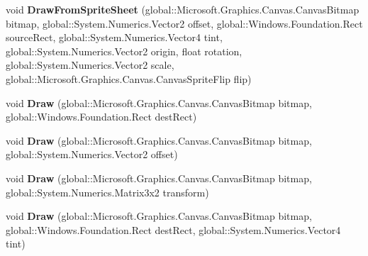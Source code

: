 \begin{DoxyCompactItemize}
\mbox{\label{interface_microsoft_1_1_graphics_1_1_canvas_1_1_i_canvas_sprite_batch_ac11b7ca2c7e66d7f79048004f3a75b53}} 
void {\bfseries Draw\+From\+Sprite\+Sheet} (global\+::\+Microsoft.\+Graphics.\+Canvas.\+Canvas\+Bitmap bitmap, global\+::\+System.\+Numerics.\+Vector2 offset, global\+::\+Windows.\+Foundation.\+Rect source\+Rect, global\+::\+System.\+Numerics.\+Vector4 tint, global\+::\+System.\+Numerics.\+Vector2 origin, float rotation, global\+::\+System.\+Numerics.\+Vector2 scale, global\+::\+Microsoft.\+Graphics.\+Canvas.\+Canvas\+Sprite\+Flip flip)
\item 
\mbox{\label{interface_microsoft_1_1_graphics_1_1_canvas_1_1_i_canvas_sprite_batch_a523bb7703d792520261dec0792f80b61}} 
void {\bfseries Draw} (global\+::\+Microsoft.\+Graphics.\+Canvas.\+Canvas\+Bitmap bitmap, global\+::\+Windows.\+Foundation.\+Rect dest\+Rect)
\item 
\mbox{\label{interface_microsoft_1_1_graphics_1_1_canvas_1_1_i_canvas_sprite_batch_a772228b4cde10ff970a8e93625163bd8}} 
void {\bfseries Draw} (global\+::\+Microsoft.\+Graphics.\+Canvas.\+Canvas\+Bitmap bitmap, global\+::\+System.\+Numerics.\+Vector2 offset)
\item 
\mbox{\label{interface_microsoft_1_1_graphics_1_1_canvas_1_1_i_canvas_sprite_batch_ab0083cf0eb076b27d60e179234004436}} 
void {\bfseries Draw} (global\+::\+Microsoft.\+Graphics.\+Canvas.\+Canvas\+Bitmap bitmap, global\+::\+System.\+Numerics.\+Matrix3x2 transform)
\item 
\mbox{\label{interface_microsoft_1_1_graphics_1_1_canvas_1_1_i_canvas_sprite_batch_a858a891f85b1b06333536091c54eefac}} 
void {\bfseries Draw} (global\+::\+Microsoft.\+Graphics.\+Canvas.\+Canvas\+Bitmap bitmap, global\+::\+Windows.\+Foundation.\+Rect dest\+Rect, global\+::\+System.\+Numerics.\+Vector4 tint)
\item 
\mbox{\label{interface_microsoft_1_1_graphics_1_1_canvas_1_1_i_canvas_sprite_batch_a74de3e1e7c2648ca4c114b88d8751e12}} 

\end{DoxyCompactItemize}
